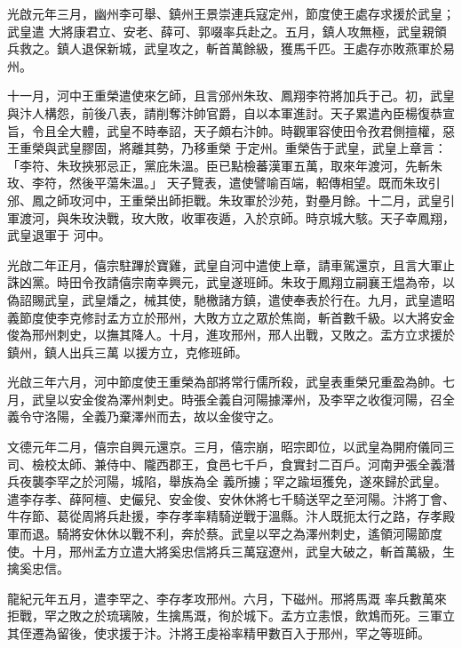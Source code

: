 \begin{pinyinscope}
 光啟元年三月，幽州李可舉、鎮州王景崇連兵寇定州，節度使王處存求援於武皇；武皇遣
 大將康君立、安老、薛可、郭啜率兵赴之。五月，鎮人攻無極，武皇親領兵救之。鎮人退保新城，武皇攻之，斬首萬餘級，獲馬千匹。王處存亦敗燕軍於易州。


十一月，河中王重榮遣使來乞師，且言邠州朱玫、鳳翔李符將加兵于己。初，武皇與汴人構怨，前後八表，請削奪汴帥官爵，自以本軍進討。天子累遣內臣楊復恭宣旨，令且全大體，武皇不時奉詔，天子頗右汴帥。時觀軍容使田令孜君側擅權，惡王重榮與武皇膠固，將離其勢，乃移重榮
 于定州。重榮告于武皇，武皇上章言：「李符、朱玫挾邪忌正，黨庇朱溫。臣已點檢蕃漢軍五萬，取來年渡河，先斬朱玫、李符，然後平蕩朱溫。」
 天子覽表，遣使譬喻百端，軺傳相望。既而朱玫引邠、鳳之師攻河中，王重榮出師拒戰。朱玫軍於沙苑，對壘月餘。十二月，武皇引軍渡河，與朱玫決戰，玫大敗，收軍夜遁，入於京師。時京城大駭。天子幸鳳翔，武皇退軍于
 河中。



 光啟二年正月，僖宗駐蹕於寶雞，武皇自河中遣使上章，請車駕還京，且言大軍止誅凶黨。時田令孜請僖宗南幸興元，武皇遂班師。朱玫于鳳翔立嗣襄王煴為帝，以偽詔賜武皇，武皇燔之，械其使，馳檄諸方鎮，遣使奉表於行在。九月，武皇遣昭義節度使李克修討孟方立於邢州，大敗方立之眾於焦崗，斬首數千級。以大將安金俊為邢州刺史，以撫其降人。十月，進攻邢州，邢人出戰，又敗之。盂方立求援於鎮州，鎮人出兵三萬
 以援方立，克修班師。



 光啟三年六月，河中節度使王重榮為部將常行儒所殺，武皇表重榮兄重盈為帥。七月，武皇以安金俊為澤州刺史。時張全義自河陽據澤州，及李罕之收復河陽，召全義令守洛陽，全義乃棄澤州而去，故以金俊守之。



 文德元年二月，僖宗自興元還京。三月，僖宗崩，昭宗即位，以武皇為開府儀同三司、檢校太師、兼侍中、隴西郡王，食邑七千戶，食實封二百戶。河南尹張全義潛兵夜襲李罕之於河陽，城陷，舉族為全
 義所擄；罕之踰垣獲免，遂來歸於武皇。遣李存孝、薛阿檀、史儼兒、安金俊、安休休將七千騎送罕之至河陽。汴將丁會、牛存節、葛從周將兵赴援，李存孝率精騎逆戰于溫縣。汴人既扼太行之路，存孝殿軍而退。騎將安休休以戰不利，奔於蔡。武皇以罕之為澤州刺史，遙領河陽節度使。十月，邢州孟方立遣大將奚忠信將兵三萬寇遼州，武皇大破之，斬首萬級，生擒奚忠信。



 龍紀元年五月，遣李罕之、李存孝攻邢州。六月，下磁州。邢將馬溉
 率兵數萬來拒戰，罕之敗之於琉璃陂，生擒馬溉，徇於城下。孟方立恚恨，飲鴆而死。三軍立其侄遷為留後，使求援于汴。汴將王虔裕率精甲數百入于邢州，罕之等班師。




\end{pinyinscope}
